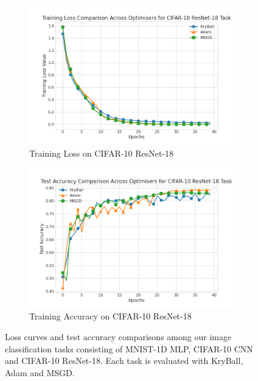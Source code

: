 \begin{figure}[!t]
    \begin{subfigure}[b]{0.48\linewidth}
        \centering
        \includegraphics[width=\linewidth]{figures/5evals/cifar10_resnet_loss.png}  %
        \caption{Training Loss on CIFAR-10 ResNet-18}
        \label{fig:cifar10_resnet_loss}
    \end{subfigure}
    \hfill
    \begin{subfigure}[b]{0.48\linewidth}
        \centering
        \includegraphics[width=\linewidth]{figures/5evals/cifar10_resnet_acc.png}  %
        \caption{Training Accuracy on CIFAR-10 ResNet-18}
        \label{fig:cifar10_resnet_acc}
    \end{subfigure}
    
    \caption{Loss curves and test accuracy comparisons among our image classification tasks consisting of MNIST-1D MLP, CIFAR-10 CNN and CIFAR-10 ResNet-18. Each task is evaluated with KryBall, Adam and MSGD.}
    \label{fig:image_classification_results}
\end{figure}

